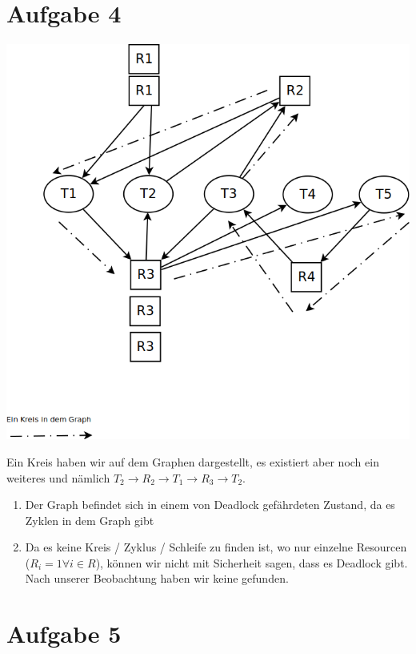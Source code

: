 \section*{Aufgabe 4}

\includegraphics[width=\textwidth]{./exercise4.png}

Ein Kreis haben wir auf dem Graphen dargestellt, es existiert aber noch ein weiteres und nämlich $T_2 \rightarrow R_2 \rightarrow T_1 \rightarrow R_3 \rightarrow T_2$. 

\begin{enumerate}

\item Der Graph befindet sich in einem von Deadlock gefährdeten Zustand, da es Zyklen in dem Graph gibt

\item Da es keine Kreis / Zyklus / Schleife zu finden ist, wo nur einzelne Resourcen ($R_i = 1 \forall i \in R$), können wir nicht mit Sicherheit sagen, dass es Deadlock gibt. Nach unserer Beobachtung haben wir keine gefunden.

\end{enumerate}

\section*{Aufgabe 5}

